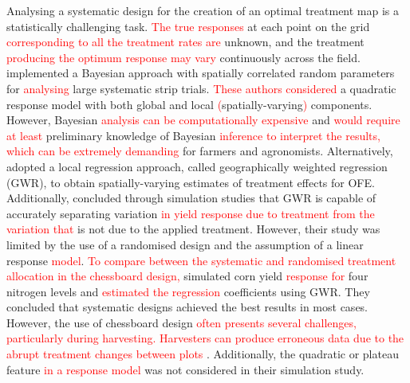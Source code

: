 \documentclass[a4paper]{article} 	%
\newcommand{\revision}[1]{\textcolor{red}{#1}}
\begin{document}
Analysing a systematic design for the creation of an optimal treatment map is a statistically challenging task. \revision{The true responses} at each point on the grid \revision{corresponding to all the treatment rates are} unknown, and the treatment \revision{producing the optimum response may vary} continuously across the field. \textcite{Cao2022Bayesian} implemented a Bayesian approach with spatially correlated random parameters for \revision{analysing} large systematic strip trials.
\revision{These authors considered} a quadratic response model with both global and local \revision{(}spatially-varying\revision{)} components. However, Bayesian \revision{analysis can be computationally expensive} and \revision{would require at least} preliminary knowledge of Bayesian \revision{inference to interpret the results, which can be extremely demanding} for farmers and agronomists. Alternatively, \textcite{Rakshit2020Novel} adopted a local regression approach, called geographically weighted regression (GWR), to obtain spatially-varying estimates of treatment effects for OFE. Additionally, \textcite{Evans2020Assessment} concluded through simulation studies that GWR is capable of accurately separating variation \revision{in yield response due to treatment from} \revision{the variation that} is not due to the applied treatment. However, their study was limited by the use of a randomised design and the assumption of a linear response \revision{model}. \revision{To compare between the systematic and randomised treatment allocation in the chessboard design,} \textcite{Alesso2021Design} simulated corn yield \revision{response} \revision{for} four nitrogen levels and \revision{estimated the regression} coefficients using GWR. They concluded that systematic designs achieved the best results in most cases. However, the use of chessboard design \revision{often presents several challenges, particularly during harvesting. Harvesters can produce erroneous data due to the abrupt treatment changes between plots} \parencite{Pringle2004FieldScale}. Additionally, the quadratic or plateau feature \revision{in a response model} was not considered in their simulation study.

\end{document}

